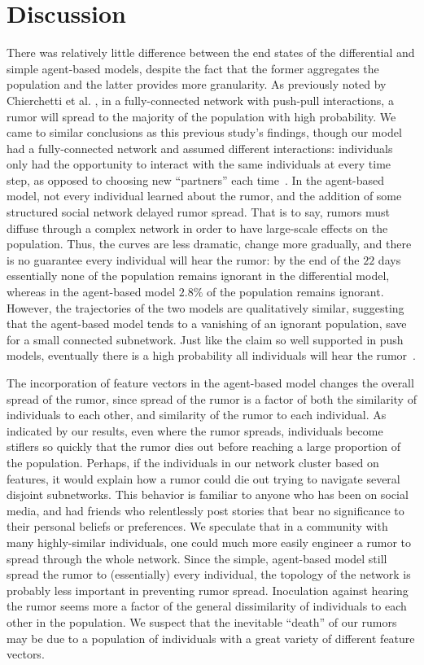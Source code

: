 \section{Discussion }
\label{sec:discussion}

There was relatively little difference between the end states of the differential and simple agent-based models, despite the fact that the former aggregates the population and the latter provides more granularity.
As previously noted by Chierchetti et al.
\cite{chierchetti-2010}, in a fully-connected network with push-pull interactions, a rumor will spread to the majority of the population with high probability.
We came to similar conclusions as this previous study's findings, though our model had a fully-connected network and assumed different interactions: individuals only had the opportunity to interact with the same individuals at every time step, as opposed to choosing new ``partners'' each time~\cite{chierchetti-2010}.
In the agent-based model, not every individual learned about the rumor, and the addition of some structured social network delayed rumor spread.
That is to say, rumors must diffuse through a complex network in order to have large-scale effects on the population.
Thus, the curves are less dramatic, change more gradually, and there is no guarantee every individual will hear the rumor: by the end of the $ 22 $ days essentially none of the population remains ignorant in the differential model, whereas in the agent-based model $ 2.8\% $ of the population remains ignorant.
However, the trajectories of the two models are qualitatively similar, suggesting that the agent-based model tends to a vanishing of an ignorant population, save for a small connected subnetwork.
Just like the claim so well supported in push models, eventually there is a high probability all individuals will hear the rumor~\cite{pittel-1987, angelopoulos-2009}.

The incorporation of feature vectors in the agent-based model changes the overall spread of the rumor, since spread of the rumor is a factor of both the similarity of individuals to each other, and similarity of the rumor to each individual.
As indicated by our results, even where the rumor spreads, individuals become stiflers so quickly that the rumor dies out before reaching a large proportion of the population.
Perhaps, if the individuals in our network cluster based on features, it would explain how a rumor could die out trying to navigate several disjoint subnetworks.
This behavior is familiar to anyone who has been on social media, and had friends who relentlessly post stories that bear no significance to their personal beliefs or preferences.
We speculate that in a community with many highly-similar individuals, one could much more easily engineer a rumor to spread through the whole network.
Since the simple, agent-based model still spread the rumor to (essentially) every individual, the topology of the network is probably less important in preventing rumor spread.
Inoculation against hearing the rumor seems more a factor of the general dissimilarity of individuals to each other in the population.
We suspect that the inevitable ``death'' of our rumors may be due to a population of individuals with a great variety of different feature vectors.

